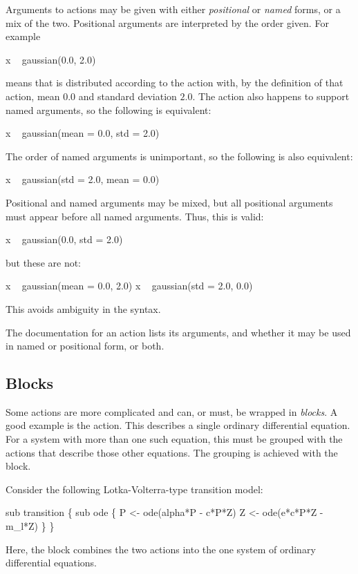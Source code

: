 Arguments to actions may be given with either \emph{positional}
 or \emph{named} forms,
or a mix of the two. Positional arguments are interpreted by the order
given. For example
\begin{bicode}
x ~ gaussian(0.0, 2.0)
\end{bicode}
means that  is distributed according to the 
action with, by the definition of that action, mean $0.0$ and standard
deviation $2.0$. The  action also happens to support named
arguments, so the following is equivalent:
\begin{bicode}
x ~ gaussian(mean = 0.0, std = 2.0)
\end{bicode}
The order of named arguments is unimportant, so the following is also
equivalent:
\begin{bicode}
x ~ gaussian(std = 2.0, mean = 0.0)
\end{bicode}

Positional and named arguments may be mixed, but all positional arguments must
appear before all named arguments. Thus, this is valid:
\begin{bicode}
x ~ gaussian(0.0, std = 2.0)
\end{bicode}
but these are not:
\begin{bicode}
x ~ gaussian(mean = 0.0, 2.0)
x ~ gaussian(std = 2.0, 0.0)
\end{bicode}
This avoids ambiguity in the syntax.

The documentation for an action lists its arguments, and whether it may be
used in named or positional form, or both.

\subsection{Blocks}

Some actions are more complicated and can, or must, be wrapped in
\emph{blocks}. A good example is the  action. This describes a
single ordinary differential
equation. For a system with more than
one such equation, this must be grouped with the actions that describe those
other equations. The grouping is achieved with the  block.

Consider the following Lotka-Volterra-type transition
model:
\begin{bicode}
sub transition \{
  sub ode \{
    P <- ode(alpha*P - c*P*Z)
    Z <- ode(e*c*P*Z - m_l*Z)
  \}
\}
\end{bicode}
Here, the  block combines the two actions into the one system of
ordinary differential equations.

